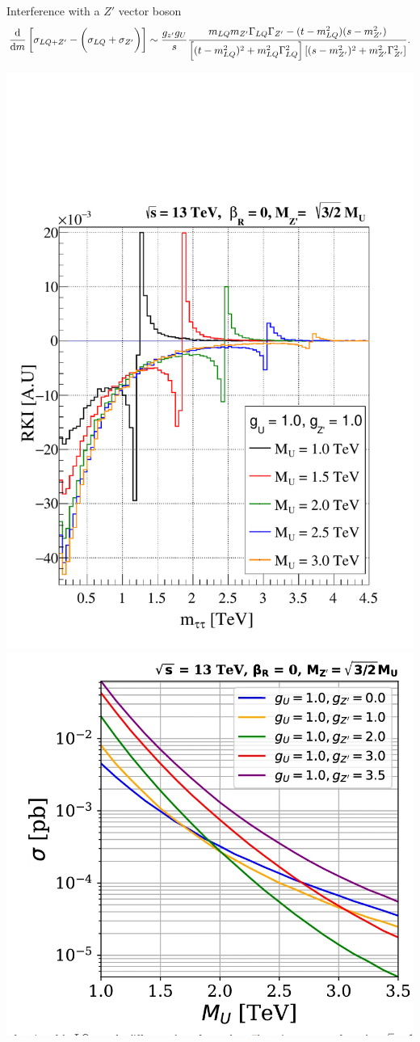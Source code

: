 \documentclass{../bredelebeamer}
\begin{document}
\begin{frame}{Interference with a $Z'$ vector boson}
	\begin{equation*}
					\dv{m}\left[
							\sigma_{ LQ+Z'}-\left(\sigma_{ LQ} +\sigma_{Z'}
							\vphantom{\frac{1}2}
							\right)
							\right]
							\sim \frac{g_{z'}g_{U}}{s}\frac{ m_{LQ}m_{Z'}\Gamma_{LQ}\Gamma_{Z'}- (t-m_{LQ}^2)(s-m_{Z'}^2)}{\left[
					(t-m_{LQ}^2)^2 + m_{LQ}^2\Gamma_{LQ}^2
			\right]
			\left[
					(s-m_{Z'}^2)^2 + m_{Z'}^2\Gamma_{Z'}^2
			\right]}.
	\end{equation*}

	\begin{center}
		\includegraphics[width=.45\linewidth]{../2023_paper/Kinematic_Interference_gu_1.0_gzp_1.0_zp_upper_limit_woRHC.pdf}
		\hfill
		\includegraphics[width=.53\linewidth]{xs_interference.png}
	\end{center}
\end{frame}
\end{document}
